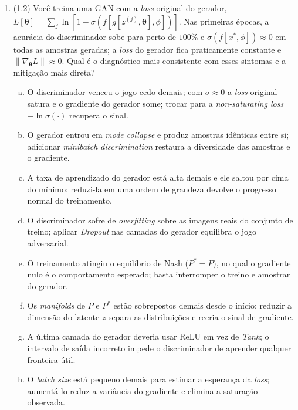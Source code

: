 \documentclass[11pt,a4paper]{article}
\newcommand{\thetav}{\boldsymbol{\theta}}
\begin{document}
\begin{enumerate}[1)]
\begin{enumerate}[a)]
    \item Apenas I está correta.
    \item Apenas II está correta.
    \item Apenas III está correta.
    \item Apenas I e II estão corretas.
    \item Apenas I e III estão corretas.
    \item Apenas II e III estão corretas.
    \item Todas estão corretas.
    \item Nenhuma está correta.
\end{enumerate}

\item (1.2) Você treina uma GAN com a \emph{loss} original do gerador, $L[\thetav] = \sum_{j} \ln\!\left[1 - \sigma\!\left(f\!\left[g[z^{(j)},\thetav],\phi\right]\right)\right]$. Nas primeiras épocas, a acurácia do discriminador sobe para perto de $100\%$ e $\sigma(f[x^{*},\phi]) \approx 0$ em todas as amostras geradas; a \emph{loss} do gerador fica praticamente constante e $\|\nabla_{\thetav} L\| \approx 0$. Qual é o diagnóstico mais consistente com esses sintomas e a mitigação mais direta?
\begin{enumerate}[a)]
    \item O discriminador venceu o jogo cedo demais; com $\sigma \approx 0$ a \emph{loss} original satura e o gradiente do gerador some; trocar para a \textit{non-saturating loss} $-\ln \sigma(\cdot)$ recupera o sinal.
    \item O gerador entrou em \textit{mode collapse} e produz amostras idênticas entre si; adicionar \textit{minibatch discrimination} restaura a diversidade das amostras e o gradiente.
    \item A taxa de aprendizado do gerador está alta demais e ele saltou por cima do mínimo; reduzi-la em uma ordem de grandeza devolve o progresso normal do treinamento.
    \item O discriminador sofre de \textit{overfitting} sobre as imagens reais do conjunto de treino; aplicar \textit{Dropout} nas camadas do gerador equilibra o jogo adversarial.
    \item O treinamento atingiu o equilíbrio de Nash ($P^{*} = P$), no qual o gradiente nulo é o comportamento esperado; basta interromper o treino e amostrar do gerador.
    \item Os \textit{manifolds} de $P$ e $P^{*}$ estão sobrepostos demais desde o início; reduzir a dimensão do latente $z$ separa as distribuições e recria o sinal de gradiente.
    \item A última camada do gerador deveria usar ReLU em vez de \emph{Tanh}; o intervalo de saída incorreto impede o discriminador de aprender qualquer fronteira útil.
    \item O \textit{batch size} está pequeno demais para estimar a esperança da \emph{loss}; aumentá-lo reduz a variância do gradiente e elimina a saturação observada.
\end{enumerate}


\end{enumerate}
\end{document}
